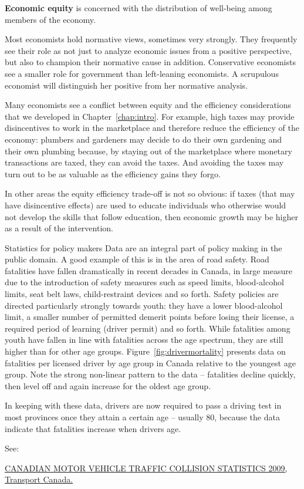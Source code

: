 \begin{DefBox}
\textbf{Economic equity} is concerned with the distribution of well-being among members of the economy.
\end{DefBox}

Most economists hold normative views, sometimes very strongly. They frequently see their role as not just to analyze economic issues from a positive perspective, but also to champion their normative cause in addition. Conservative economists see a smaller role for government than left-leaning economists. A scrupulous economist will distinguish her positive from her normative analysis. 

Many economists see a conflict between equity and the efficiency considerations that we developed in Chapter~\ref{chap:intro}. For example, high taxes may provide disincentives to work in the marketplace and therefore reduce the efficiency of the economy: plumbers and gardeners may decide to do their own gardening and their own plumbing because, by staying out of the marketplace where monetary transactions are taxed, they can avoid the taxes. And avoiding the taxes may turn out to be as valuable as the efficiency gains they forgo.

In other areas the equity efficiency trade-off is not so obvious: if taxes (that may have disincentive effects) are used to educate individuals who otherwise would not develop the skills that follow education, then economic growth may be higher as a result of the intervention.

\begin{ApplicationBox}{Statistics for policy makers \label{app:statpolicymakers}}
Data are an integral part of policy making in the public domain. A good example of this is in the area of road safety. Road fatalities have fallen dramatically in recent decades in Canada, in large measure due to the introduction of safety measures such as speed limits, blood-alcohol limits, seat belt laws, child-restraint devices and so forth. Safety policies are directed particularly strongly towards youth: they have a lower blood-alcohol limit, a smaller number of permitted demerit points before losing their license, a required period of learning (driver permit) and so forth. While fatalities among youth have fallen in line with fatalities across the age spectrum, they are still higher than for other age groups. Figure~\ref{fig:drivermortality} presents data on fatalities per licensed driver by age group in Canada relative to the youngest age group. Note  the strong non-linear pattern to the data -- fatalities decline quickly, then level off and again increase for the oldest age group.

\bigskip
In keeping with these data, drivers are now required to pass a driving test in most provinces once they attain a certain age -- usually 80, because the data indicate that fatalities increase when drivers age.

\bigskip
See:

\bigskip
\parbox{15cm}{
\href{http://www.tc.gc.ca/media/documents/roadsafety/tp3322-2009_eng.pdf}{CANADIAN MOTOR VEHICLE TRAFFIC COLLISION STATISTICS 2009,\\ Transport Canada.}} 
\end{ApplicationBox}

